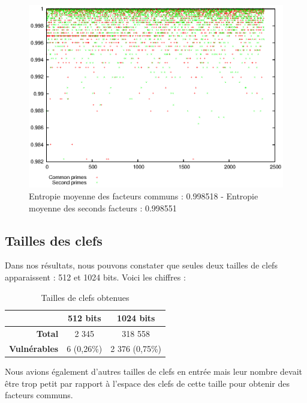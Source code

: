 \begin{figure}[H]
\centering
\includegraphics[width=16cm]{images/entropyprimes.eps}
\caption[Entropie moyenne]{Entropie moyenne des facteurs communs : 0.998518 - Entropie moyenne des seconds facteurs : 0.998551}
\label{entropiePrime}
\end{figure}


\subsection{Tailles des clefs}
Dans nos résultats, nous pouvons constater que seules deux tailles de clefs apparaissent : 512 et 1024 bits. Voici les chiffres :


\begin{table}[H]
\centering
\begin{tabular}{|r|c|c|}
\hline
\textbf{}&\textbf{512 bits}&\textbf{1024 bits}\\
\hline
\textbf{Total}&2 345&318 558\\
\hline
\textbf{Vulnérables}&6 (0,26\%)&2 376 (0,75\%)\\
\hline
\end{tabular}
\caption{Tailles de clefs obtenues}
\label{tailles}
\end{table}


Nous avions également d'autres tailles de clefs en entrée mais leur nombre devait être trop petit par rapport à l'espace des clefs de cette taille pour obtenir des facteurs communs.


